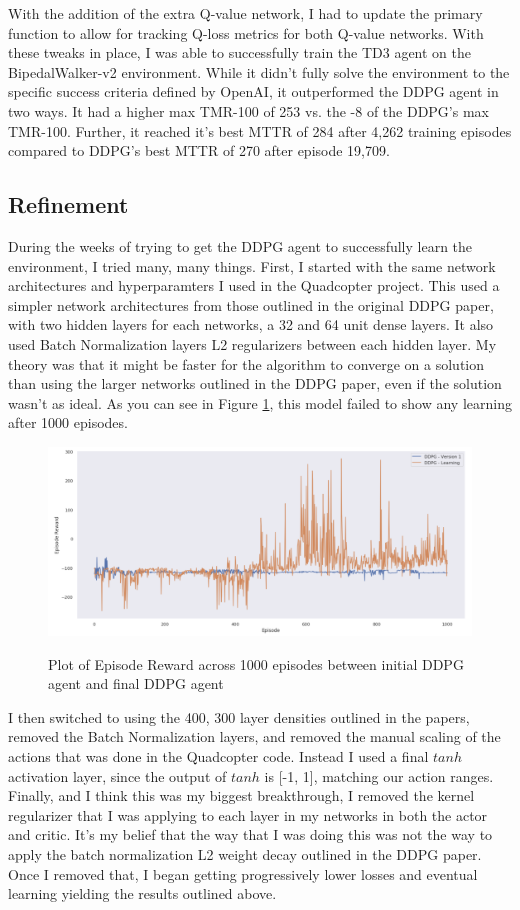 \documentclass{article}
\begin{document}
With the addition of the extra Q-value network, I had to update the primary function to allow for tracking Q-loss metrics for both Q-value networks. With these tweaks in place, I was able to successfully train the TD3 agent on the BipedalWalker-v2 environment. While it didn't fully solve the environment to the specific success criteria defined by OpenAI, it outperformed the DDPG agent in two ways. It had a higher max TMR-100 of 253 vs. the -8 of the DDPG's max TMR-100. Further, it reached it's best MTTR of 284 after 4,262 training episodes compared to DDPG's best MTTR of 270 after episode 19,709.


\subsection{Refinement}
During the weeks of trying to get the DDPG agent to successfully learn the environment, I tried many, many things. First, I started with the same network architectures and hyperparamters I used in the Quadcopter project. This used a simpler network architectures from those outlined in the original DDPG paper, with two hidden layers for each networks, a 32 and 64 unit dense layers. It also used Batch Normalization layers L2 regularizers between each hidden layer. My theory was that it might be faster for the algorithm to converge on a solution than using the larger networks outlined in the DDPG paper, even if the solution wasn't as ideal. As you can see in Figure \ref{fig:ddpg_refinement}, this model failed to show any learning after 1000 episodes.

\begin{figure}[ht]
\caption{Plot of Episode Reward across 1000 episodes between initial DDPG agent and final DDPG agent}
\centering
\includegraphics[scale=0.4]{report/images/ddpg_refinement.png}
\label{fig:ddpg_refinement}
\end{figure}

I then switched to using the 400, 300 layer densities outlined in the papers, removed the Batch Normalization layers, and removed the manual scaling of the actions that was done in the Quadcopter code. Instead I used a final $tanh$ activation layer, since the output of $tanh$ is [-1, 1], matching our action ranges. Finally, and I think this was my biggest breakthrough, I removed the kernel regularizer that I was applying to each layer in my networks in both the actor and critic. It's my belief that the way that I was doing this was not the way to apply the batch normalization L2 weight decay outlined in the DDPG paper. Once I removed that, I began getting progressively lower losses and eventual learning yielding the results outlined above. 
\end{document}
